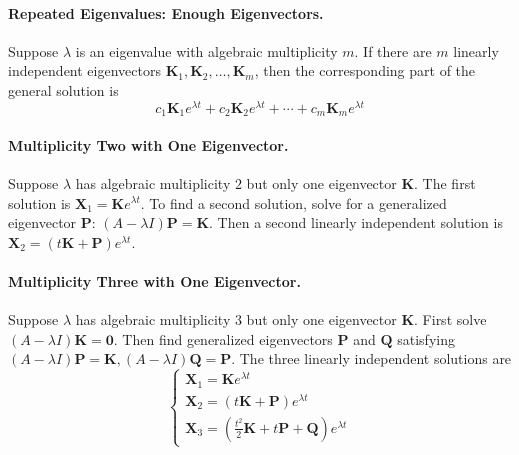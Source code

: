 \documentclass[oneside]{book}
\begin{document}
\paragraph{Repeated Eigenvalues: Enough Eigenvectors.}
Suppose $\lambda$ is an eigenvalue with algebraic multiplicity $m$. If there are
$m$ linearly independent eigenvectors $\mathbf{K}_1,\mathbf{K}_2,\ldots,\mathbf{K}_m$, then the corresponding part of the general solution is
\[
    c_1\mathbf{K}_1e^{\lambda t}
    +
    c_2\mathbf{K}_2e^{\lambda t}
    +\cdots+
    c_m\mathbf{K}_me^{\lambda t}
\]


\paragraph{Multiplicity Two with One Eigenvector.}
Suppose $\lambda$ has algebraic multiplicity $2$ but only one eigenvector
$\mathbf{K}$. The first solution is $\mathbf{X}_1=\mathbf{K}e^{\lambda t}$. To find a second solution, solve for a generalized eigenvector $\mathbf{P}$: $ (A-\lambda I)\mathbf{P}=\mathbf{K}$. Then a second linearly independent solution is $\mathbf{X}_2=(t\mathbf{K}+\mathbf{P})e^{\lambda t}$. 

\paragraph{Multiplicity Three with One Eigenvector.}
Suppose $\lambda$ has algebraic multiplicity $3$ but only one eigenvector
$\mathbf{K}$. First solve $(A-\lambda I)\mathbf{K}=\mathbf{0}$. Then find generalized eigenvectors $\mathbf{P}$ and $\mathbf{Q}$ satisfying $(A-\lambda I)\mathbf{P}=\mathbf{K},  (A-\lambda I)\mathbf{Q}=\mathbf{P}$. The three linearly independent solutions are
\[
\begin{cases}
    \mathbf{X}_1=\mathbf{K}e^{\lambda t} \\
    \mathbf{X}_2=(t\mathbf{K}+\mathbf{P})e^{\lambda t} \\
    \mathbf{X}_3=
    \left(
        \frac{t^2}{2}\mathbf{K}
        +
        t\mathbf{P}
        +
        \mathbf{Q}
    \right)e^{\lambda t} 
\end{cases}
\]
\end{document}
